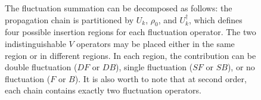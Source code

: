 \documentclass{simple-notes}
\begin{document}
\begin{figure}[h]
    \centering

\caption{The fluctuation summation can be decomposed as follows: the propagation chain is partitioned by $U_k$, $\rho_0$, and $U_k^\dagger$, which defines four possible insertion regions for each fluctuation operator. The two indistinguishable $V$ operators may be placed either in the same region or in different regions. In each region, the contribution can be double fluctuation ($DF$ or $DB$), single fluctuation ($SF$ or $SB$), or no fluctuation ($F$ or $B$). It is also worth to note that at second order, each chain contains exactly two fluctuation operators. }
\end{figure}
\end{document}

